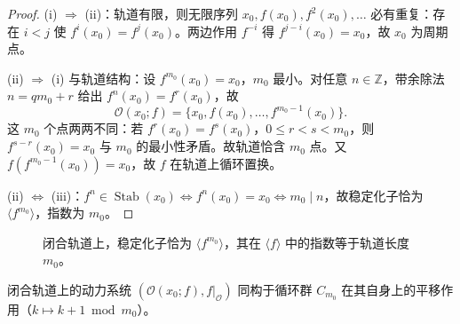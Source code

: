 \begin{proof}
(i) $\Rightarrow$ (ii)：轨道有限，则无限序列 $x_0,f(x_0),f^2(x_0),\dots$ 必有重复：存在 $i<j$ 使 $f^i(x_0)=f^j(x_0)$。两边作用 $f^{-i}$ 得 $f^{j-i}(x_0)=x_0$，故 $x_0$ 为周期点。

(ii) $\Rightarrow$ (i) 与轨道结构：设 $f^{m_0}(x_0)=x_0$，$m_0$ 最小。对任意 $n\in\mathbb{Z}$，带余除法 $n=qm_0+r$ 给出 $f^n(x_0)=f^r(x_0)$，故
\[
\mathcal{O}(x_0;f)=\{x_0,f(x_0),\dots,f^{m_0-1}(x_0)\}.
\]
这 $m_0$ 个点两两不同：若 $f^r(x_0)=f^s(x_0)$，$0\le r<s<m_0$，则 $f^{s-r}(x_0)=x_0$ 与 $m_0$ 的最小性矛盾。故轨道恰含 $m_0$ 点。又 $f(f^{m_0-1}(x_0))=x_0$，故 $f$ 在轨道上循环置换。

(ii) $\iff$ (iii)：$f^n\in\operatorname{Stab}(x_0)\iff f^n(x_0)=x_0\iff m_0\mid n$，故稳定化子恰为 $\langle f^{m_0}\rangle$，指数为 $m_0$。
\end{proof}

\begin{figure}[htbp]
\centering
{}
\caption{闭合轨道上，稳定化子恰为 $\langle f^{m_0}\rangle$，其在 $\langle f\rangle$ 中的指数等于轨道长度 $m_0$。}
\label{fig:closed_orbit_stabilizer}
\end{figure}

\begin{corollary}[闭合轨道的周期结构]\label{cor:closed_orbit_structure}
闭合轨道上的动力系统 $(\mathcal{O}(x_0;f),f|_{\mathcal{O}})$ 同构于循环群 $C_{m_0}$ 在其自身上的平移作用（$k\mapsto k+1\bmod m_0$）。
\end{corollary}

